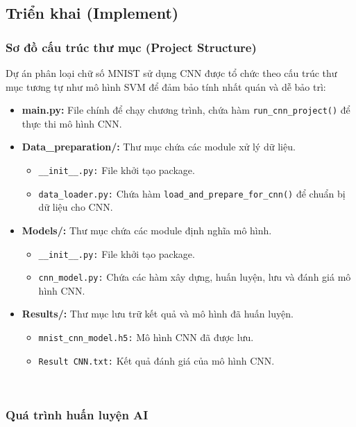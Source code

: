 \documentclass[../DoAn.tex]{subfiles}
\begin{document}
\subsection{Triển khai (Implement)}

\subsubsection{Sơ đồ cấu trúc thư mục (Project Structure)}

Dự án phân loại chữ số MNIST sử dụng CNN được tổ chức theo cấu trúc thư mục tương tự như mô hình SVM để đảm bảo tính nhất quán và dễ bảo trì:

\begin{itemize}
    \item \textbf{main.py:} File chính để chạy chương trình, chứa hàm \texttt{run\_cnn\_project()} để thực thi mô hình CNN.
    
    \item \textbf{Data\_preparation/:} Thư mục chứa các module xử lý dữ liệu.
    \begin{itemize}
        \item \texttt{\_\_init\_\_.py:} File khởi tạo package.
        \item \texttt{data\_loader.py:} Chứa hàm \texttt{load\_and\_prepare\_for\_cnn()} để chuẩn bị dữ liệu cho CNN.
    \end{itemize}
    
    \item \textbf{Models/:} Thư mục chứa các module định nghĩa mô hình.
    \begin{itemize}
        \item \texttt{\_\_init\_\_.py:} File khởi tạo package.
        \item \texttt{cnn\_model.py:} Chứa các hàm xây dựng, huấn luyện, lưu và đánh giá mô hình CNN.
    \end{itemize}
    
    \item \textbf{Results/:} Thư mục lưu trữ kết quả và mô hình đã huấn luyện.
    \begin{itemize}
        \item \texttt{mnist\_cnn\_model.h5:} Mô hình CNN đã được lưu.
        \item \texttt{Result CNN.txt:} Kết quả đánh giá của mô hình CNN.
    \end{itemize}
\end{itemize}
\\
\subsubsection{Quá trình huấn luyện AI}
\end{document}
